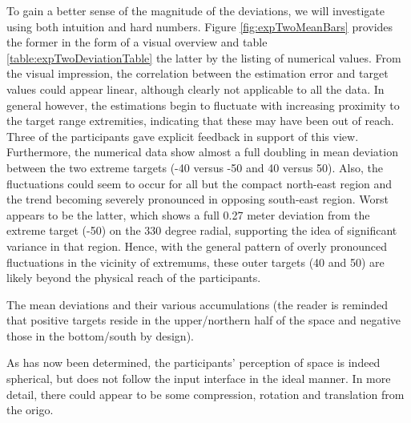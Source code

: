 To gain a better sense of the magnitude of the deviations, we will investigate using both intuition and hard numbers. Figure \ref{fig:expTwoMeanBars} provides the former in the form of a visual overview and table \ref{table:expTwoDeviationTable} the latter by the listing of numerical values. From the visual impression, the correlation between the estimation error and target values could appear linear, although  clearly not  applicable to all the data. In general however, the estimations begin to fluctuate with increasing proximity to the target range extremities, indicating that these may have been out of reach. Three of the participants gave explicit feedback in support of this view. Furthermore, the numerical data show almost a full doubling in mean deviation between the two extreme targets (-40 versus -50  and 40 versus 50). Also, the fluctuations could seem to occur for all but the compact north-east region and the trend becoming severely pronounced in opposing south-east region. Worst appears to be the latter, which shows a full 0.27 meter deviation from the extreme target (-50) on the 330 degree radial, supporting the idea of significant variance in that region. Hence, with the general pattern of overly pronounced fluctuations in the vicinity of extremums, these outer targets (40 and 50) are likely beyond the physical reach of the participants.


\begin{table}[!hb]
	\centering
	\resizebox{8cm}{!}{		
		
	}
	\caption{The mean deviations and their various accumulations (the reader is reminded that positive targets reside in the upper/northern half of the space and negative those in the bottom/south by design).}
 	\label{table:expTwoDeviationTable}				
\end{table}



As has now been determined, the participants' perception of space is indeed spherical, but does not follow the input interface in the ideal manner. In more detail, there could appear to  be some compression, rotation and translation from the origo. 

